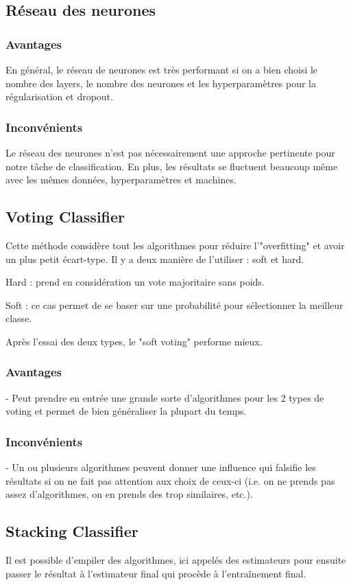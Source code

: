 \documentclass{article}
\begin{document}
\subsection{Réseau des neurones}
\subsubsection{Avantages}
En général, le réseau de neurones est très performant si on a bien choisi le nombre des layers, le nombre des neurones et les hyperparamètres pour la régularisation et dropout. 
\subsubsection{Inconvénients}
Le réseau des neurones n'est pas nécessairement une approche pertinente pour notre tâche de classification. En plus, les résultats se fluctuent beaucoup même avec les mêmes données, hyperparamètres et machines. 

\subsection{Voting Classifier}
Cette méthode considère tout les algorithmes pour réduire l'"overfitting" et avoir un plus petit écart-type. Il y a deux manière de l'utiliser : soft et hard.

Hard : prend en considération un vote majoritaire sans poids.

Soft : ce cas permet de se baser sur une probabilité pour sélectionner la meilleur classe.

Après l'essai des deux types, le "soft voting" performe mieux.

\subsubsection{Avantages}
- Peut prendre en entrée une grande sorte d'algorithmes pour les 2 types de voting et permet de bien généraliser la plupart du temps.

\subsubsection{Inconvénients}
- Un ou plusieurs algorithmes peuvent donner une influence qui falsifie les résultats si on ne fait pas attention aux choix de ceux-ci (i.e. on ne prends pas assez d'algorithmes, on en prends des trop similaires, etc.).

\subsection{Stacking Classifier}
Il est possible d'empiler des algorithmes, ici appelés des estimateurs pour ensuite passer le résultat à l'estimateur final qui procède à l'entraînement final.
\end{document}
